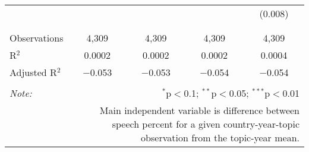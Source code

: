 \begin{table}[!htbp]
\begin{tabular}{@{\extracolsep{5pt}}lcccc}
  &  &  &  & (0.008) \\ 
  & & & & \\ 
\hline \\[-1.8ex] 
Observations & 4,309 & 4,309 & 4,309 & 4,309 \\ 
R$^{2}$ & 0.0002 & 0.0002 & 0.0002 & 0.0004 \\ 
Adjusted R$^{2}$ & $-$0.053 & $-$0.053 & $-$0.054 & $-$0.054 \\ 
\hline 
\hline \\[-1.8ex] 
\textit{Note:}  & \multicolumn{4}{r}{$^{*}$p$<$0.1; $^{**}$p$<$0.05; $^{***}$p$<$0.01} \\ 
 & \multicolumn{4}{r}{Main independent variable is difference between speech percent for a given country-year-topic observation from the topic-year mean.} \\ 
\end{tabular} 
\end{table} 
